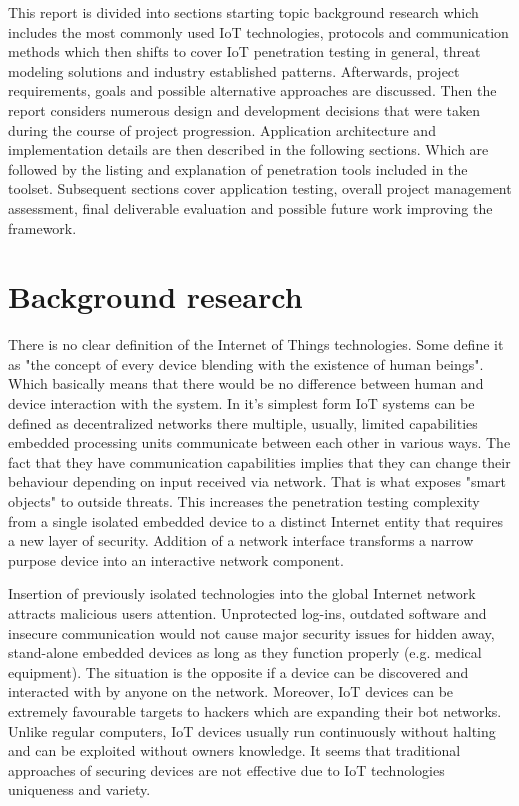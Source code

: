 This report is divided into sections starting topic background research which includes the most commonly used IoT technologies, protocols and communication methods which then shifts to cover IoT penetration testing in general, threat modeling solutions and industry established patterns. Afterwards, project requirements, goals and possible alternative approaches are discussed. Then the report considers numerous design and development decisions that were taken during the course of project progression. Application architecture and implementation details are then described in the following sections. Which are followed by the listing and explanation of penetration tools included in the toolset. Subsequent sections cover application testing, overall project management assessment, final deliverable evaluation and possible future work improving the framework.

\section{Background research}
There is no clear definition of the Internet of Things technologies. Some define it as "the concept of every device blending with the existence of human beings"\cite{DBLP:journals/corr/MendezPY17}. Which basically means that there would be no difference between human and device interaction with the system. In it's simplest form IoT systems can be defined as decentralized networks there multiple, usually, limited capabilities embedded processing units communicate between each other in various ways. The fact that they have communication capabilities implies that they can change their behaviour depending on input received via network. That is what exposes "smart objects" to outside threats\cite{riahi:hal-00868362}. This increases the penetration testing complexity from a single isolated embedded device to a distinct Internet entity that requires a new layer of security. Addition of a network interface transforms a narrow purpose device into an interactive network component.

Insertion of previously isolated technologies into the global Internet network attracts malicious users attention. Unprotected log-ins, outdated software and insecure communication would not cause major security issues for hidden away, stand-alone embedded devices as long as they function properly (e.g. medical equipment). The situation is the opposite if a device can be discovered and interacted with by anyone on the network. Moreover, IoT devices can be extremely favourable targets to hackers which are expanding their bot networks. Unlike regular computers, IoT devices usually run continuously without halting and can be exploited without owners knowledge\cite{191952}. It seems that traditional approaches of securing devices are not effective\cite{DBLP:journals/corr/abs-1803-05022} due to IoT technologies uniqueness and variety.


